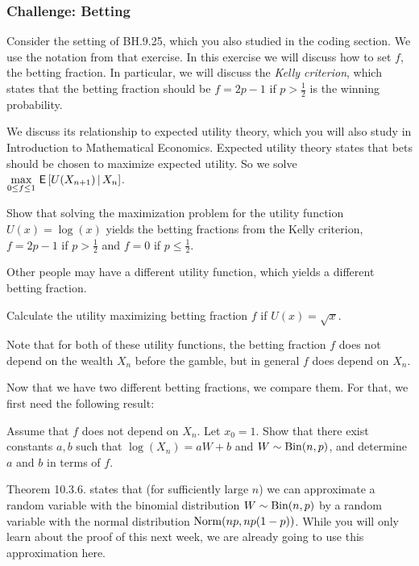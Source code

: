 \subsubsection{Challenge: Betting}
\label{sec:betting}

Consider the setting of BH.9.25, which you also studied in the coding section. We use the notation from that exercise.
In this exercise we will discuss how to set $f$, the betting fraction. In particular, we will discuss the \textit{Kelly criterion}, which states that the betting fraction should be $f = 2p-1$ if $p > \tfrac12$ is the winning probability.

We discuss its relationship to expected utility theory, which you will also study in Introduction to Mathematical Economics. Expected utility theory states that bets should be chosen to maximize expected utility. So we solve $\max\limits_{0 \leq f \leq 1} \,\mathsf{E}\left[U(X_{n+1}) \,\middle|\, X_n\right]$.



\begin{exercise}
Show that solving the maximization problem for the utility function $U(x) = \log(x)$ yields the betting fractions from the Kelly criterion, $f = 2p-1$ if $p > \tfrac12$ and $f=0$ if $p \leq \tfrac12$.
\end{exercise}

Other people may have a different utility function, which yields a different betting fraction.

\begin{exercise}
Calculate the utility maximizing betting fraction $f$ if $U(x) = \sqrt{x}$.
\end{exercise}

Note that for both of these utility functions, the betting fraction $f$ does not depend on the wealth $X_n$ before the gamble, but in general $f$ does depend on $X_n$.

Now that we have two different betting fractions, we compare them. For that, we first need the following result:

\begin{exercise}
Assume that $f$ does not depend on $X_n$. Let $x_0 = 1$. Show that there exist constants $a, b$ such that $\log (X_n) = a W + b$ and $W  \sim \mathrm{Bin}(n, p)$, and determine $a$ and $b$ in terms of $f$.
\end{exercise}

Theorem 10.3.6. states that (for sufficiently large $n$) we can approximate a random variable with the binomial distribution $W  \sim \mathrm{Bin}(n, p)$ by a random variable with the normal distribution $\mathrm{Norm}(np, np(1-p))$. While you will only learn about the proof of this next week, we are already going to use this approximation here.

